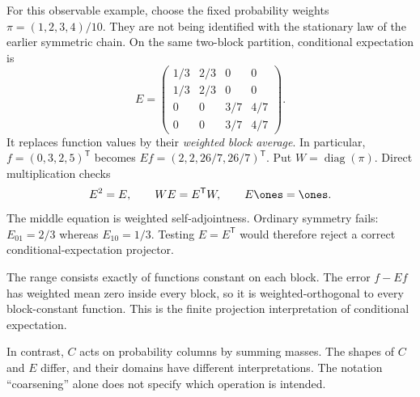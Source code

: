 For this observable example, choose the fixed probability weights $\pi=(1,2,3,4)/10$. They are not being identified with the stationary law of the earlier symmetric chain. On the same two-block partition, conditional expectation is
\[
E=\begin{pmatrix}
1/3&2/3&0&0\\1/3&2/3&0&0\\0&0&3/7&4/7\\0&0&3/7&4/7
\end{pmatrix}.
\]
It replaces function values by their \emph{weighted block average}. In particular, $f=(0,3,2,5)^{\mathsf T}$ becomes $Ef=(2,2,26/7,26/7)^{\mathsf T}$.
Put $W=\operatorname{diag}(\pi)$. Direct multiplication checks
\[
E^2=E,\qquad WE=E^{\mathsf T}W,\qquad E\ones=\ones.
\]
The middle equation is weighted self-adjointness. Ordinary symmetry fails: $E_{01}=2/3$ whereas $E_{10}=1/3$. Testing $E=E^{\mathsf T}$ would therefore reject a correct conditional-expectation projector.

The range consists exactly of functions constant on each block. The error $f-Ef$ has weighted mean zero inside every block, so it is weighted-orthogonal to every block-constant function. This is the finite projection interpretation of conditional expectation.

In contrast, $C$ acts on probability columns by summing masses. The shapes of $C$ and $E$ differ, and their domains have different interpretations. The notation ``coarsening'' alone does not specify which operation is intended.

